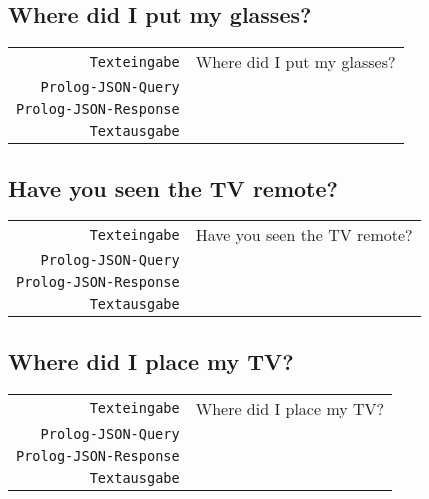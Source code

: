 \documentclass[a4paper,oneside]{scrartcl}
\begin{document}
\subsection{Where did I put my glasses?}
\begin{tabular}{rl}
	\texttt{Texteingabe}		& Where did I put my glasses?	\\
	\texttt{Prolog-JSON-Query}	&			\\
	\texttt{Prolog-JSON-Response}	&			\\
	\texttt{Textausgabe}		& 			\\
\end{tabular}

\subsection{Have you seen the TV remote?}
\begin{tabular}{rl}
	\texttt{Texteingabe}		& Have you seen the TV remote?	\\
	\texttt{Prolog-JSON-Query}	&			\\
	\texttt{Prolog-JSON-Response}	&			\\
	\texttt{Textausgabe}		& 			\\
\end{tabular}

\subsection{Where did I place my TV?}
\begin{tabular}{rl}
	\texttt{Texteingabe}		& Where did I place my TV?	\\
	\texttt{Prolog-JSON-Query}	&			\\
	\texttt{Prolog-JSON-Response}	&			\\
	\texttt{Textausgabe}		& 			\\
\end{tabular}
\end{document}
